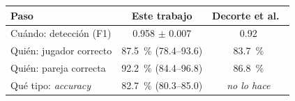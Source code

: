 \begin{tabular}{lcc}
\toprule
\textbf{Paso} & \textbf{Este trabajo} & \textbf{Decorte et al.~\cite{decorte2024padel}} \\
\midrule
Cuándo: detección (F1) & \num{0.958} $\pm$ \num{0.007} & \num{0.92} \\
Quién: jugador correcto & \SI{87.5}{\percent} (\num{78.4}--\num{93.6}) & \SI{83.7}{\percent} \\
Quién: pareja correcta & \SI{92.2}{\percent} (\num{84.4}--\num{96.8}) & \SI{86.8}{\percent} \\
Qué tipo: \emph{accuracy} & \SI{82.7}{\percent} (\num{80.3}--\num{85.0}) & \emph{no lo hace} \\
\bottomrule
\end{tabular}
